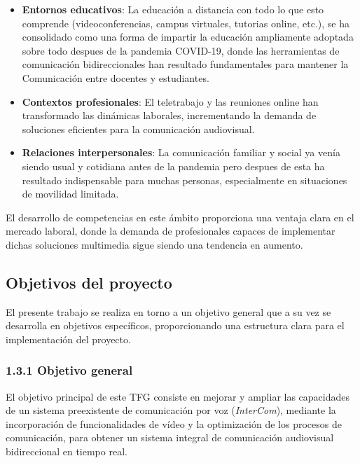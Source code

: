 \begin{itemize}
    \item \textbf{Entornos educativos}: La educación a distancia con todo lo que esto comprende (videoconferencias, campus virtuales, tutorias online, etc.), se ha consolidado como una forma de impartir la educación ampliamente adoptada sobre todo despues de la pandemia COVID-19, donde las herramientas de comunicación bidireccionales han resultado fundamentales para mantener la Comunicación entre docentes y estudiantes.
    
    \item \textbf{Contextos profesionales}: El teletrabajo y las reuniones online han transformado las dinámicas laborales, incrementando la demanda de soluciones eficientes para la comunicación audiovisual.
    
    \item \textbf{Relaciones interpersonales}: La comunicación familiar y social ya venía siendo usual y cotidiana antes de la pandemia pero despues de esta ha resultado indispensable para muchas personas, especialmente en situaciones de movilidad limitada.
\end{itemize}

\vspace{\baselineskip}

El desarrollo de competencias en este ámbito proporciona una ventaja clara en el mercado laboral, donde la demanda de profesionales capaces de implementar dichas soluciones multimedia sigue siendo una tendencia en aumento.

\subsection{Objetivos del proyecto}

El presente trabajo se realiza en torno a un objetivo general que a su vez se desarrolla en objetivos específicos, proporcionando una estructura clara para el implementación del proyecto.

\subsubsection*{1.3.1 Objetivo general}

El objetivo principal de este TFG consiste en mejorar y ampliar las capacidades de un sistema preexistente de comunicación por voz (\textit{InterCom}), mediante la incorporación de funcionalidades de vídeo y la optimización de los procesos de comunicación, para obtener un sistema integral de comunicación audiovisual bidireccional en tiempo real.

